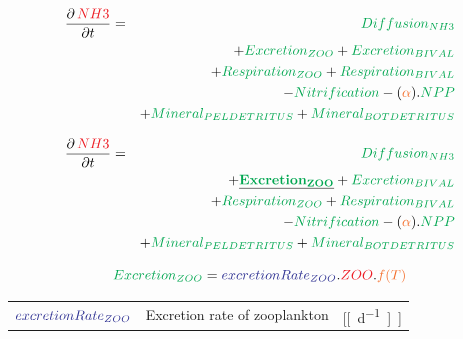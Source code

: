 \documentclass[final,xcolor=dvipsnames]{beamer}
\begin{document}
      \begin{frame}   
	\begin{exampleblock}{}
	  \begin{eqnarray*}
	    \small
	    \frac{\partial\,\varC[NH3]}{\partial t} & = & \proC[Diffusion_{NH3}] \\
	    & & + \proC[Excretion_{ZOO}] + \proC[Excretion_{BIVAL}] \\
	    & &+ \proC[Respiration_{ZOO}] + \proC[Respiration_{BIVAL}]\\
	    & & - \proC[Nitrification]  - (\worC[\alpha]).\proC[NPP] \\
	    & & + \proC[Mineral_{PELDETRITUS}] + \proC[Mineral_{BOTDETRITUS}] \\
	  \end{eqnarray*}
	\end{exampleblock}
      \end{frame}
      
            \begin{frame}   
	\begin{exampleblock}{}
	  \begin{eqnarray*}
	    \small
	    \frac{\partial\,\varC[NH3]}{\partial t} & = & \proC[Diffusion_{NH3}] \\
	    & & +  \underline{\mathbf{\proC[Excretion_{ZOO}]}} + \proC[Excretion_{BIVAL}] \\
	    & &+ \proC[Respiration_{ZOO}] + \proC[Respiration_{BIVAL}]\\
	    & & - \proC[Nitrification]  - (\worC[\alpha]).\proC[NPP] \\
	    & & + \proC[Mineral_{PELDETRITUS}] + \proC[Mineral_{BOTDETRITUS}] \\
	  \end{eqnarray*}
	\end{exampleblock}
	\begin{exampleblock}{}
	  \begin{equation*}
	    \proC[Excretion_{ZOO}] = \parC[excretionRate_{ZOO}] . \varC[ZOO] .\worC[f(T)]
	  \end{equation*}
	  \begin{tabular}{ l l l }
	    $\parC[excretionRate_{ZOO}]$ &  Excretion rate of zooplankton &  [\unit[d^{-1}]] 
	  \end{tabular}
	    \end{exampleblock}
      \end{frame}
      
\end{document}
